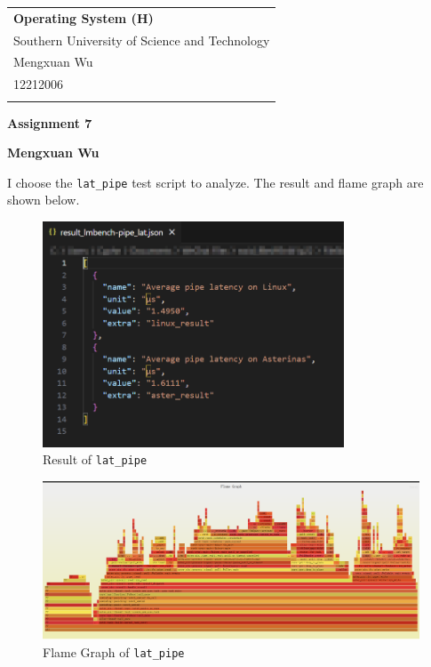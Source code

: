 \documentclass[a4paper,12pt]{article}
\begin{document}
\thispagestyle{empty} %

\begin{tabular}{p{15.5cm}}
{\large \bf Operating System (H)} \\
Southern University of Science and Technology \\ Mengxuan Wu \\ 12212006 \\
\hline
\\
\end{tabular}

\vspace*{0.3cm} %

\begin{center}
	{\Large \bf Assignment 7}
	\vspace{2mm}

	{\bf Mengxuan Wu}
		
\end{center}  

\vspace{0.4cm}

I choose the \texttt{lat\_pipe} test script to analyze. The result and flame graph are shown below.

\begin{figure}[H]
	\centering
	\includegraphics[width=0.8\textwidth]{figure/json_result.png}
	\caption{Result of \texttt{lat\_pipe}}
\end{figure}

\begin{figure}[H]
	\centering
	\includegraphics[width=\textwidth]{figure/before.png}
	\caption{Flame Graph of \texttt{lat\_pipe}}
\end{figure}
\end{document}

